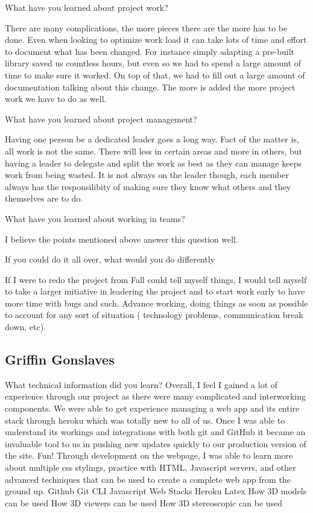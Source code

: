 \documentclass[letterpaper, 10pt, draftclsnofoot, compsoc, onecolumn]{IEEEtran}
\begin{document}
What have you learned about project work?

There are many complications, the more pieces there are the more has to be done. Even when looking to optimize work load it can take lots of time and effort to document what has been changed. For instance simply adapting a pre-built library saved us countless hours, but even so we had to spend a large amount of time to make sure it worked. On top of that, we had to fill out a large amount of documentation talking about this change. The more is added the more project work we have to do as well.

What have you learned about project management?

Having one person be a dedicated leader goes a long way. Fact of the matter is, all work is not the same. There will less in certain areas and more in others, but having a leader to delegate and split the work as best as they can manage keeps work from being wasted. It is not always on the leader though, each member always has the responsilibity of making sure they know what others and they themselves are to do.

What have you learned about working in teams?

I believe the points mentioned above answer this question well.

If you could do it all over, what would you do differently

If I were to redo the project from Fall could tell myself things, I would tell myself to take a larger initiative in leadering the project and to start work early to have more time with bugs and such. Advance working, doing things as soon as possible to account for any sort of situation ( technology problems, communication break down, etc).

\subsection{Griffin Gonslaves}
What technical information did you learn?
Overall, I feel I gained a lot of experience through our project as there were many complicated and interworking components. We were able to get experience managing a web app and its entire stack through heroku which was totally new to all of us. Once I was able to understand its workings and integrations with both git and GitHub it became an invaluable tool to us in pushing new updates quickly to our production version of the site. Fun! Through development on the webpage, I was able to learn more about multiple css stylings, practice with HTML, Javascript servers, and other advanced techniques that can be used to create a complete web app from the ground up.  
Github
Git CLI
Javascript
Web Stacks
Heroku
Latex
How 3D models can be used
How 3D viewers can be used
How 3D stereoscopic can be used
\end{document}
